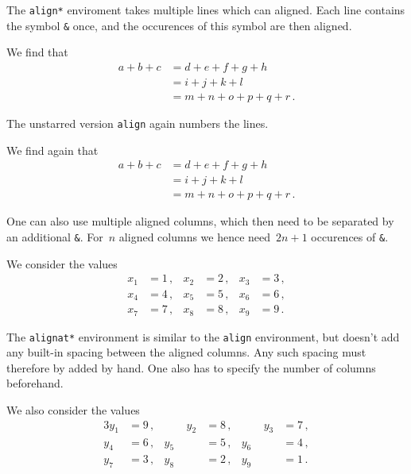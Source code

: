 \documentclass[a4paper, 10pt, abstract=on, headings=standardclasses]{scrartcl}
\begin{document}
The \texttt{align*} enviroment takes multiple lines which can aligned.
Each line contains the symbol \texttt{\&} once, and the occurences of this symbol are then aligned.
\begin{LTXexample}[pos = r]
  We find that
  \begin{align*}
    a + b + c
    &=
    d + e + f + g + h
    \\
    &=
    i + j + k + l
    \\
    &=
    m + n + o + p + q + r \,.
  \end{align*}
\end{LTXexample}
The unstarred version \texttt{align} again numbers the lines.
\begin{LTXexample}[pos = r]
  We find again that
  \begin{align}
    a + b + c
    &=
    d + e + f + g + h
    \\
    &=
    i + j + k + l
    \\
    &=
    m + n + o + p + q + r \,.
  \end{align}
\end{LTXexample}
One can also use multiple aligned columns, which then need to be separated by an additional \texttt{\&}.
For~$n$ aligned columns we hence need~$2n+1$ occurences of \texttt{\&}.
\begin{LTXexample}[pos = b]
  We consider the values
  \begin{align*}
    x_1 &= 1 \,,  &   x_2 &= 2 \,,  &   x_3 &= 3 \,,  \\
    x_4 &= 4 \,,  &   x_5 &= 5 \,,  &   x_6 &= 6 \,,  \\
    x_7 &= 7 \,,  &   x_8 &= 8 \,,  &   x_9 &= 9 \,.
  \end{align*}
\end{LTXexample}

The \texttt{alignat*} environment is similar to the \texttt{align} environment, but doesn’t add any built-in spacing between the aligned columns.
Any such spacing must therefore by added by hand.
One also has to specify the number of columns beforehand.
\begin{LTXexample}[pos = b]
  We also consider the values
  \begin{alignat*}{3}
    y_1 &= 9 \,,  &\qquad   y_2 &= 8 \,,  &\qquad   y_3 &= 7 \,,  \\
    y_4 &= 6 \,,  &         y_5 &= 5 \,,  &         y_6 &= 4 \,,  \\
    y_7 &= 3 \,,  &         y_8 &= 2 \,,  &         y_9 &= 1 \,.
  \end{alignat*}
\end{LTXexample}
\end{document}
